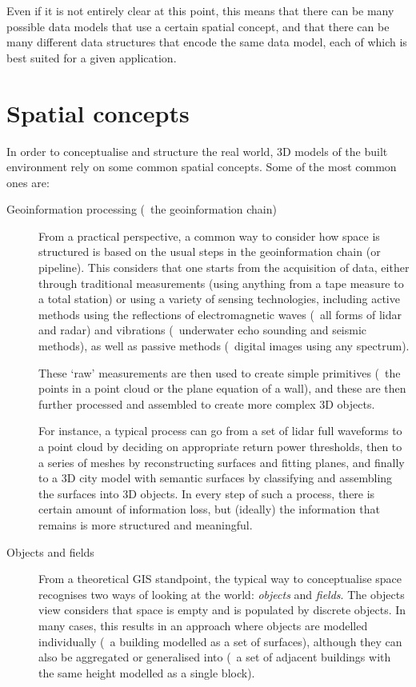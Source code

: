 Even if it is not entirely clear at this point, this means that there can be many possible data models that use a certain spatial concept, and that there can be many different data structures that encode the same data model, each of which is best suited for a given application.

\section{Spatial concepts}

In order to conceptualise and structure the real world, 3D models of the built environment rely on some common spatial concepts.
Some of the most common ones are:

\begin{description}

\item[Geoinformation processing (\ie\ the geoinformation chain)]
From a practical perspective, a common way to consider how space is structured is based on the usual steps in the geoinformation chain (or pipeline).
This considers that one starts from the acquisition of data, either through traditional measurements (using anything from a tape measure to a total station) or using a variety of sensing technologies, including active methods using the reflections of electromagnetic waves (\eg\ all forms of lidar and radar) and vibrations (\eg\ underwater echo sounding and seismic methods), as well as passive methods (\eg\ digital images using any spectrum).

These `raw' measurements are then used to create simple primitives (\eg\ the points in a point cloud or the plane equation of a wall), and these are then further processed and assembled to create more complex 3D objects.

For instance, a typical process can go from a set of lidar full waveforms to a point cloud by deciding on appropriate return power thresholds, then to a series of meshes by reconstructing surfaces and fitting planes, and finally to a 3D city model with semantic surfaces by classifying and assembling the surfaces into 3D objects.
In every step of such a process, there is certain amount of information loss, but (ideally) the information that remains is more structured and meaningful.

\item[Objects and fields]
From a theoretical GIS standpoint, the typical way to conceptualise space recognises two ways of looking at the world: \emph{objects} and \emph{fields}.
The objects view considers that space is empty and is populated by discrete objects.
In many cases, this results in an approach where objects are modelled individually (\eg\ a building modelled as a set of surfaces), although they can also be aggregated or generalised into (\eg\ a set of adjacent buildings with the same height modelled as a single block).


\end{description}
